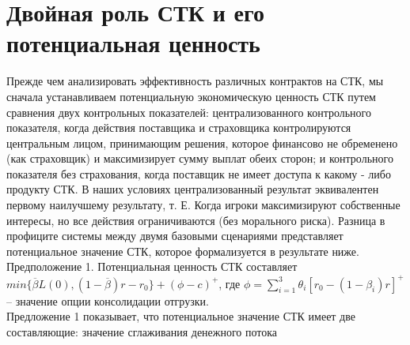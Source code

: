 \documentclass[a4paper,12pt]{article}
\begin{document}
\section{Двойная роль СТК и его потенциальная ценность}
Прежде чем анализировать эффективность различных контрактов на СТК, мы сначала устанавливаем потенциальную экономическую ценность СТК путем сравнения двух контрольных показателей: централизованного контрольного показателя, когда действия поставщика и страховщика контролируются центральным лицом, принимающим решения, которое финансово не обременено (как страховщик) и максимизирует сумму выплат обеих сторон; и контрольного показателя без страхования, когда поставщик не имеет доступа к какому - либо продукту СТК. В наших условиях централизованный результат эквивалентен первому наилучшему результату, т. Е. Когда игроки максимизируют собственные интересы, но все действия ограничиваются (без морального риска). Разница в профиците системы между двумя базовыми сценариями представляет потенциальное значение СТК, которое формализуется в результате ниже.
\\

Предположение 1. Потенциальная ценность СТК составляет $min\{ \overline{\beta}L(0), (1 -\overline{\beta})r - r_{0} \} + (\phi - c)^{+} $, где $\phi = \sum_{i = 1}^{3}\theta_{i}\left[ r_{0} - (1-\beta_{i})r \right]^{+}$ -- значение опции консолидации отгрузки.
\\

Предложение 1 показывает, что потенциальное значение СТК имеет две составляющие: значение сглаживания денежного потока
\end{document}
